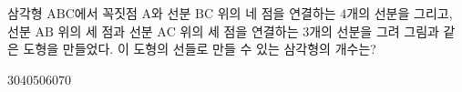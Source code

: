 \hspace*{2mm}\begin{minipage}[t]{\dimexpr\linewidth-2mm\relax}\vspace{0pt}
삼각형 $\mathrm{ABC}$에서 꼭짓점 $\mathrm{A}$와 선분 $\mathrm{BC}$ 위의 네 점을 연결하는 $4$개의 선분을 그리고, 선분 $\mathrm{AB}$ 위의 세 점과 선분 $\mathrm{AC}$ 위의 세 점을 연결하는 $3$개의 선분을 그려 그림과 같은 도형을 만들었다. 이 도형의 선들로 만들 수 있는 삼각형의 개수는?
\par\smallskip\begin{center}\resizebox{\ifdim\width>\linewidth\linewidth\else\width\fi}{!}{}\end{center}
\begin{choices32}{$30$}{$40$}{$50$}{$60$}{$70$}\end{choices32}\end{minipage}
